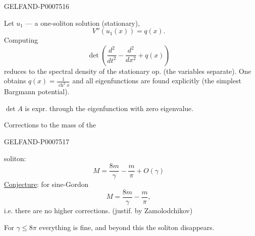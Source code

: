 \begin{GelfandAdjacentEvidence}{GELFAND-P000751}{6}


Let \(u_1\) --- a one-soliton solution (stationary),
\begin{equation*}
V''(u_1(x))=q(x).
\tag{42}
\end{equation*}
Computing
\begin{equation*}
\det\left(\frac{d^2}{dt^2}-\frac{d^2}{dx^2}+q(x)\right)
\tag{43}
\end{equation*}
reduces to the spectral density of the stationary op. (the variables separate). One obtains \(q(x)=\frac1{\operatorname{ch}^2x}\)
and all eigenfunctions are found explicitly (the simplest Bargmann potential).

\(\det A\) is expr. through the eigenfunction with zero eigenvalue.

Corrections to the mass of the
\end{GelfandAdjacentEvidence}
\begin{GelfandAdjacentEvidence}{GELFAND-P000751}{7}

soliton:
\begin{equation*}
M=\frac{8m}{\gamma}-\frac m\pi+O(\gamma)
\tag{44}
\end{equation*}
\underline{Conjecture}: for sine-Gordon
\begin{equation*}
M=\frac{8m}{\gamma}-\frac m\pi,
\tag{45}
\end{equation*}
i.e. there are no higher corrections. (justif. by Zamolodchikov)
\end{GelfandAdjacentEvidence}


For \(\gamma\leq8\pi\) everything is fine, and beyond this the soliton disappears.


